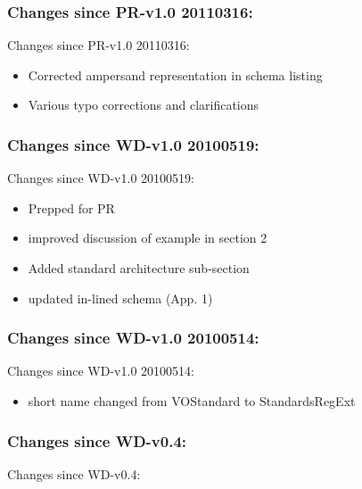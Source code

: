 \documentclass[11pt,a4paper]{ivoa}
\begin{document}
{{\begin{itemize}
\end{itemize}

\subsubsection{Changes since PR-v1.0 20110316:}
Changes since PR-v1.0 20110316:
\begin{itemize}

\item Corrected ampersand representation in schema listing{}

\item Various typo corrections and clarifications{}

\end{itemize}

\subsubsection{Changes since WD-v1.0 20100519:}
Changes since WD-v1.0 20100519:
\begin{itemize}

\item  Prepped for PR {}

\item  improved discussion of example in section 2 {}

\item  Added standard architecture sub-section {}

\item  updated in-lined schema (App. 1) {}

\end{itemize}

\subsubsection{Changes since WD-v1.0 20100514:}
Changes since WD-v1.0 20100514:
\begin{itemize}

\item  short name changed from VOStandard to StandardsRegExt {}

\end{itemize}

\subsubsection{Changes since WD-v0.4:}
Changes since WD-v0.4:
\begin{itemize}


\end{itemize}}}
\end{document}
